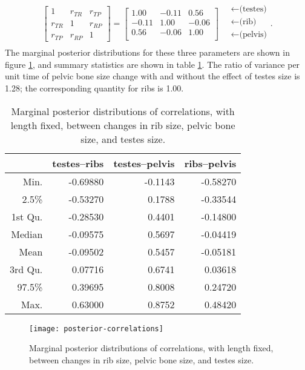 \documentclass{article}
\begin{document}
\begin{align}
\begin{bmatrix}
  1 & r_{TR} & r_{TP} \\ 
  r_{TR} & 1 & r_{RP} \\ 
  r_{TP} & r_{RP} & 1 
 \end{bmatrix}
 =
\begin{bmatrix}
   1.00 & -0.11 & 0.56 \\ 
   -0.11 & 1.00 & -0.06 \\ 
   0.56 & -0.06 & 1.00 \\ 
 \end{bmatrix}
\quad \begin{matrix}
  \leftarrow \text{(testes)} \\
  \leftarrow \text{(rib)} \\
  \leftarrow \text{(pelvis)} \\
\end{matrix}  .
\end{align}
The marginal posterior distributions for these three parameters
are shown in figure \ref{fig:posterior_cors},
and summary statistics are shown in table \ref{tab:posterior_cors}.
The ratio of variance per unit time of pelvic bone size change
with and without the effect of testes size
is 1.28; the corresponding quantity for ribs is 1.00.

\begin{table}[ht]
\centering
\begin{tabular}{rrrr}
  \hline
        &  testes--ribs & testes--pelvis & ribs--pelvis \\
  \hline
 Min. &       -0.69880 &       -0.1143 &    -0.58270 \\
 2.5\% &      -0.53270 &        0.1788 &    -0.33544 \\
 1st Qu. &    -0.28530 &        0.4401 &    -0.14800 \\
 Median &     -0.09575 &        0.5697 &    -0.04419 \\
 Mean &       -0.09502 &        0.5457 &    -0.05181 \\
 3rd Qu. &     0.07716 &        0.6741 &     0.03618 \\
 97.5\%  &     0.39695 &        0.8008 &     0.24720 \\
 Max. &        0.63000 &        0.8752 &     0.48420 \\
   \hline
\end{tabular}
  \caption{Marginal posterior distributions of correlations, with length fixed,
  between changes in rib size, pelvic bone size, and testes size.
  \label{tab:posterior_cors}
}
\end{table}


\begin{figure}[ht]
  \begin{center}
    \texttt{[image: posterior-correlations]}
  \end{center}
  \caption{Marginal posterior distributions of correlations, with length fixed,
  between changes in rib size, pelvic bone size, and testes size.
  \label{fig:posterior_cors}
  }
\end{figure}
\end{document}

